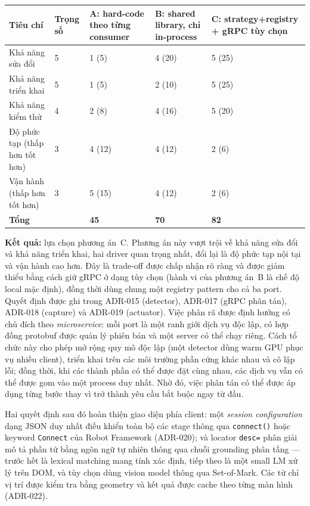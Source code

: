 \documentclass[11pt,a4paper]{report}
\newcommand{\code}[1]{\texttt{#1}}
\begin{document}
\begin{longtable}{@{}p{5.2cm}p{1.2cm}p{2.2cm}p{2.2cm}p{2.2cm}@{}}
\toprule
\textbf{Tiêu chí} & \textbf{Trọng số} & \textbf{A: hard-code theo từng consumer} & \textbf{B: shared library, chỉ in-process} & \textbf{C: strategy+registry + gRPC tùy chọn} \\
\midrule
\endhead
Khả năng sửa đổi & 5 & 1 (5) & 4 (20) & 5 (25) \\
Khả năng triển khai & 5 & 1 (5) & 2 (10) & 5 (25) \\
Khả năng kiểm thử & 4 & 2 (8) & 4 (16) & 5 (20) \\
Độ phức tạp (thấp hơn tốt hơn) & 3 & 4 (12) & 4 (12) & 2 (6) \\
Vận hành (thấp hơn tốt hơn) & 3 & 5 (15) & 4 (12) & 2 (6) \\
\midrule
\textbf{Tổng} & & \textbf{45} & \textbf{70} & \textbf{82} \\
\bottomrule
\end{longtable}

\textbf{Kết quả:} lựa chọn phương án~C. Phương án này vượt trội về khả năng sửa đổi và
khả năng triển khai, hai driver quan trọng nhất, đổi lại là độ phức tạp nội tại và vận hành
cao hơn. Đây là trade-off được chấp nhận rõ ràng và được giảm thiểu bằng cách giữ gRPC
ở dạng tùy chọn (hành vi của phương án~B là chế độ local mặc định), đồng thời dùng chung
một registry pattern cho cả ba port. Quyết định được ghi trong ADR-015 (detector), ADR-017
(gRPC phân tán), ADR-018 (capture) và ADR-019 (actuator).
Việc phân rã được định hướng có chủ đích theo \emph{microservice}: mỗi port là một
ranh giới dịch vụ độc lập, có hợp đồng protobuf được quản lý phiên bản và một server
có thể chạy riêng. Cách tổ chức này cho phép mở rộng quy mô độc lập (một detector dùng
warm GPU phục vụ nhiều client), triển khai trên các môi trường phần cứng khác nhau và
cô lập lỗi; đồng thời, khi các thành phần có thể được đặt cùng nhau, các dịch vụ vẫn có
thể được gom vào một process duy nhất. Nhờ đó, việc phân tán có thể được áp dụng từng
bước thay vì trở thành yêu cầu bắt buộc ngay từ đầu.

Hai quyết định sau đó hoàn thiện giao diện phía client: một \emph{session configuration}
dạng JSON duy nhất điều khiển toàn bộ các stage thông qua \code{connect()} hoặc keyword
\code{Connect} của Robot Framework (ADR-020); và locator \code{desc=} phân giải mô tả
phần tử bằng ngôn ngữ tự nhiên thông qua chuỗi grounding phân tầng --- trước hết là
lexical matching mang tính xác định, tiếp theo là một small LM xử lý trên DOM, và tùy
chọn dùng vision model thông qua Set-of-Mark. Các từ chỉ vị trí được kiểm tra bằng
geometry và kết quả được cache theo từng màn hình (ADR-022).
\end{document}
